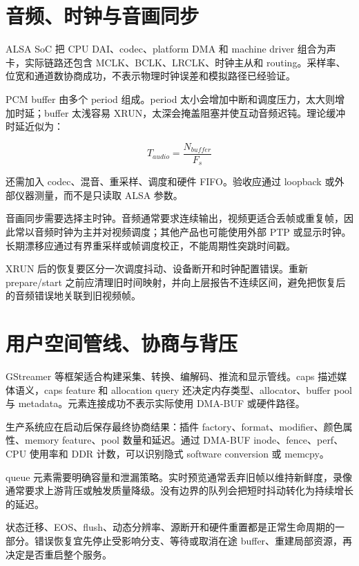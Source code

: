 \section{音频、时钟与音画同步}

ALSA SoC 把 CPU DAI、codec、platform DMA 和 machine driver 组合为声卡，实际链路还包含 MCLK、BCLK、LRCLK、时钟主从和 routing\cite{linux-asoc}。采样率、位宽和通道数协商成功，不表示物理时钟误差和模拟路径已经验证。

PCM buffer 由多个 period 组成。period 太小会增加中断和调度压力，太大则增加时延；buffer 太浅容易 XRUN，太深会掩盖阻塞并使互动音频迟钝。理论缓冲时延近似为：

\begin{equation}
  T_{audio}=\frac{N_{buffer}}{F_s}
\end{equation}

还需加入 codec、混音、重采样、调度和硬件 FIFO。验收应通过 loopback 或外部仪器测量，而不是只读取 ALSA 参数。

音画同步需要选择主时钟。音频通常要求连续输出，视频更适合丢帧或重复帧，因此常以音频时钟为主并对视频调度；其他产品也可能使用外部 PTP 或显示时钟。长期漂移应通过有界重采样或帧调度校正，不能周期性突跳时间戳。

XRUN 后的恢复要区分一次调度抖动、设备断开和时钟配置错误。重新 prepare/start 之前应清理旧时间映射，并向上层报告不连续区间，避免把恢复后的音频错误地关联到旧视频帧。

\section{用户空间管线、协商与背压}

GStreamer 等框架适合构建采集、转换、编解码、推流和显示管线\cite{gstreamer-doc}。caps 描述媒体语义，caps feature 和 allocation query 还决定内存类型、allocator、buffer pool 与 metadata。元素连接成功不表示实际使用 DMA-BUF 或硬件路径。

生产系统应在启动后保存最终协商结果：插件 factory、format、modifier、颜色属性、memory feature、pool 数量和延迟。通过 DMA-BUF inode、fence、perf、CPU 使用率和 DDR 计数，可以识别隐式 software conversion 或 memcpy。

queue 元素需要明确容量和泄漏策略。实时预览通常丢弃旧帧以维持新鲜度，录像通常要求上游背压或触发质量降级。没有边界的队列会把短时抖动转化为持续增长的延迟。

状态迁移、EOS、flush、动态分辨率、源断开和硬件重置都是正常生命周期的一部分。错误恢复宜先停止受影响分支、等待或取消在途 buffer、重建局部资源，再决定是否重启整个服务。


